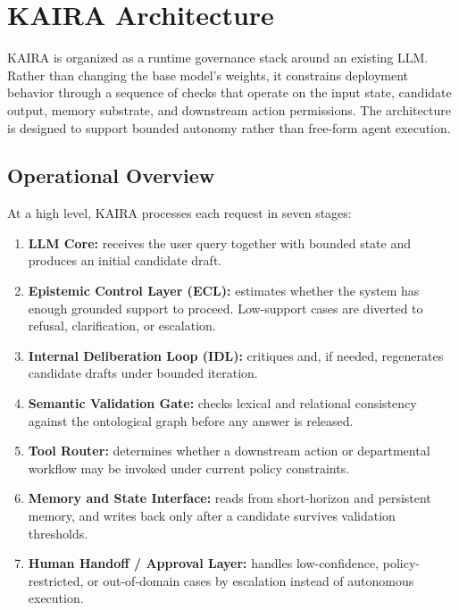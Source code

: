 \documentclass[11pt,a4paper]{article}
\begin{document}
\section{KAIRA Architecture}

KAIRA is organized as a runtime governance stack around an existing LLM. Rather than changing the base model's weights, it constrains deployment behavior through a sequence of checks that operate on the input state, candidate output, memory substrate, and downstream action permissions. The architecture is designed to support bounded autonomy rather than free-form agent execution.

\subsection{Operational Overview}
At a high level, KAIRA processes each request in seven stages:
\begin{enumerate}
  \item \textbf{LLM Core:} receives the user query together with bounded state and produces an initial candidate draft.
  \item \textbf{Epistemic Control Layer (ECL):} estimates whether the system has enough grounded support to proceed. Low-support cases are diverted to refusal, clarification, or escalation.
  \item \textbf{Internal Deliberation Loop (IDL):} critiques and, if needed, regenerates candidate drafts under bounded iteration.
  \item \textbf{Semantic Validation Gate:} checks lexical and relational consistency against the ontological graph before any answer is released.
  \item \textbf{Tool Router:} determines whether a downstream action or departmental workflow may be invoked under current policy constraints.
  \item \textbf{Memory and State Interface:} reads from short-horizon and persistent memory, and writes back only after a candidate survives validation thresholds.
  \item \textbf{Human Handoff / Approval Layer:} handles low-confidence, policy-restricted, or out-of-domain cases by escalation instead of autonomous execution.
\end{enumerate}
\end{document}
